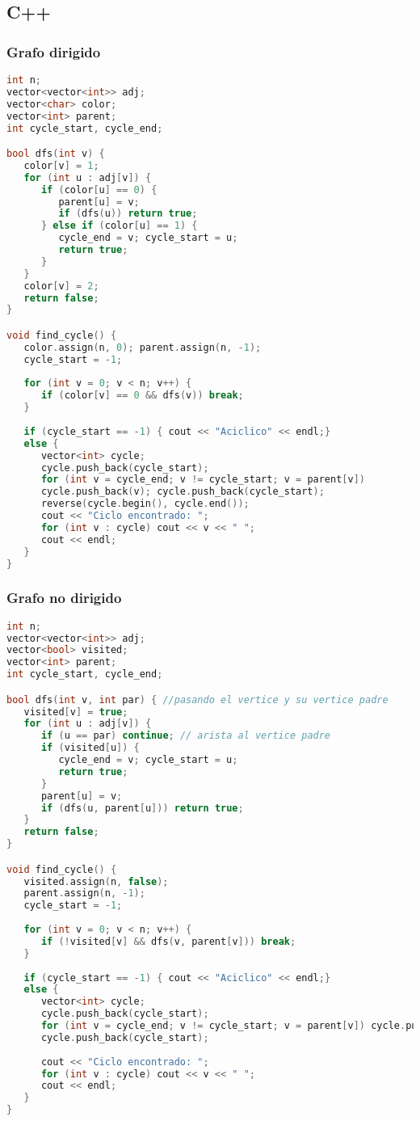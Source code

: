 \subsection{C++}

\subsubsection{Grafo dirigido}
\begin{lstlisting}[language=C++]
int n;
vector<vector<int>> adj;
vector<char> color;
vector<int> parent;
int cycle_start, cycle_end;

bool dfs(int v) {
   color[v] = 1;
   for (int u : adj[v]) {
      if (color[u] == 0) {
         parent[u] = v;
         if (dfs(u)) return true;
      } else if (color[u] == 1) {
         cycle_end = v; cycle_start = u;
         return true;
      }
   }
   color[v] = 2;
   return false;
}

void find_cycle() {
   color.assign(n, 0); parent.assign(n, -1);
   cycle_start = -1;
	
   for (int v = 0; v < n; v++) {
      if (color[v] == 0 && dfs(v)) break;
   }
	
   if (cycle_start == -1) { cout << "Aciclico" << endl;} 
   else {
      vector<int> cycle;
      cycle.push_back(cycle_start);
      for (int v = cycle_end; v != cycle_start; v = parent[v])
      cycle.push_back(v); cycle.push_back(cycle_start);
      reverse(cycle.begin(), cycle.end());
      cout << "Ciclo encontrado: ";
      for (int v : cycle) cout << v << " ";
      cout << endl;
   }
}
\end{lstlisting}


\subsubsection{Grafo no dirigido}
\begin{lstlisting}[language=C++]
int n;
vector<vector<int>> adj;
vector<bool> visited;
vector<int> parent;
int cycle_start, cycle_end;

bool dfs(int v, int par) { //pasando el vertice y su vertice padre
   visited[v] = true;
   for (int u : adj[v]) {
      if (u == par) continue; // arista al vertice padre
      if (visited[u]) {
         cycle_end = v; cycle_start = u;
         return true;
      }
      parent[u] = v;
      if (dfs(u, parent[u])) return true;
   }
   return false;
}

void find_cycle() {
   visited.assign(n, false);
   parent.assign(n, -1);
   cycle_start = -1;
	
   for (int v = 0; v < n; v++) {
      if (!visited[v] && dfs(v, parent[v])) break;
   }
	
   if (cycle_start == -1) { cout << "Aciclico" << endl;} 
   else {
      vector<int> cycle;
      cycle.push_back(cycle_start);
      for (int v = cycle_end; v != cycle_start; v = parent[v]) cycle.push_back(v);
      cycle.push_back(cycle_start);
		
      cout << "Ciclo encontrado: ";
      for (int v : cycle) cout << v << " ";
      cout << endl;
   }
}
\end{lstlisting}

